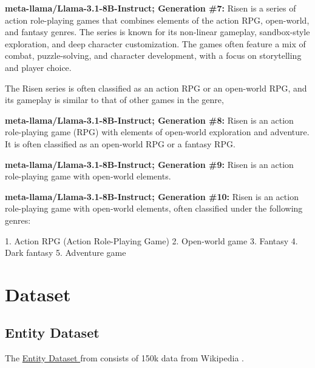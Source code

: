 \documentclass{article} %
\newcommand{\known}[1]{\textcolor{KnownGreen}{#1}}
\begin{document}
\begin{tcolorbox}[
    colback=white,
    colframe=lightblue,
    arc=10pt,
    boxrule=3pt,
    left=10pt,
    right=10pt,
    top=10pt,
    bottom=10pt
]
\noindent\faRobot \hspace{5pt} \textbf{meta-llama/Llama-3.1-8B-Instruct; Generation \#7:}
Risen is a series of action \known{role-playing games} that combines elements of the action RPG, open-world, and fantasy genres. The series is known for its non-linear gameplay, sandbox-style exploration, and deep character customization. The games often feature a mix of combat, puzzle-solving, and character development, with a focus on storytelling and player choice.

The Risen series is often classified as an action RPG or an open-world RPG, and its gameplay is similar to that of other games in the genre,
\vspace{8pt}

\noindent\faRobot \hspace{5pt} \textbf{meta-llama/Llama-3.1-8B-Instruct; Generation \#8:}
Risen is an action \known{role-playing game} (RPG) with elements of open-world exploration and adventure. It is often classified as an open-world RPG or a fantasy RPG.
\vspace{8pt}

\noindent\faRobot \hspace{5pt} \textbf{meta-llama/Llama-3.1-8B-Instruct; Generation \#9:}
Risen is an action \known{role-playing game} with open-world elements.
\vspace{8pt}

\noindent\faRobot \hspace{5pt} \textbf{meta-llama/Llama-3.1-8B-Instruct; Generation \#10:}
Risen is an action \known{role-playing game} with open-world elements, often classified under the following genres:

1.  Action RPG (Action Role-Playing Game)
2. Open-world game
3. Fantasy
4. Dark fantasy
5. Adventure game
\end{tcolorbox}
\section{Dataset}
\label{app:dataset}
\subsection{Entity Dataset}
\label{app:entity_dataset}


The \href{https://github.com/javiferran/sae_entities/tree/main/dataset/processed/entity_prompts}{ Entity Dataset } from \cite{ferrando2025entity} 
consists of 150k data from Wikipedia .
\end{document}
